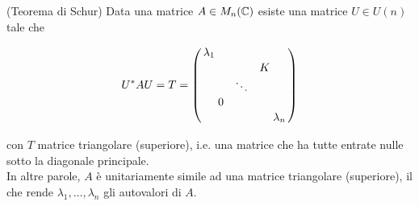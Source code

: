 \begin{theorem}(Teorema di Schur)
	Data una matrice $ A \in M_{n}(\mathbb{C}) $ esiste una matrice $ U \in U(n) $ tale che
	
	\begin{equation}
		U^{*} A U = T = %
		\smqty(\dmat{\lambda_{1}, & & K \\ & \ddots & \\ 0 & & ,\lambda_{n}})
	\end{equation}

	con $ T $ matrice triangolare (superiore), i.e. una matrice che ha tutte entrate nulle sotto la diagonale principale.\\
	In altre parole, $ A $ è unitariamente simile ad una matrice triangolare (superiore), il che rende $ \lambda_{1},\dots,\lambda_{n} $ gli autovalori di $ A $.
\end{theorem}

